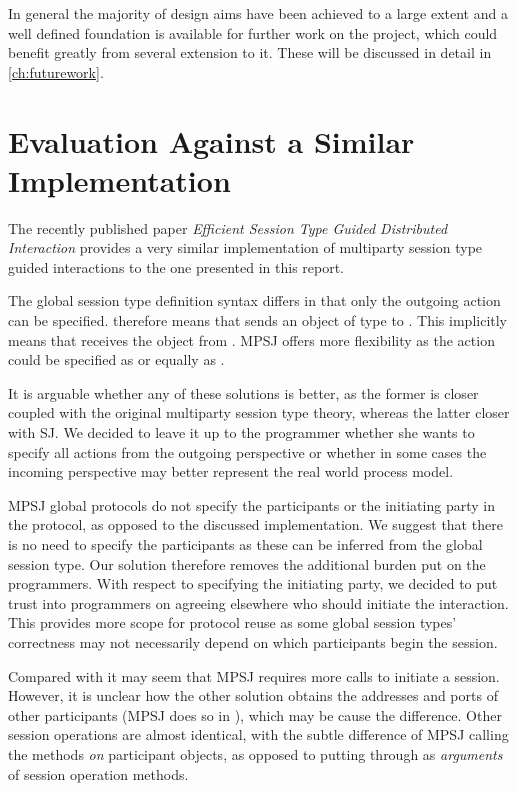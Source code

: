 In general the majority of design aims have been achieved to a large extent and a well defined foundation is available for further work on the project, which could benefit greatly from several extension to it. These will be discussed in detail in \autoref{ch:futurework}.


\section{Evaluation Against a Similar Implementation}

The recently published paper \textit{Efficient Session Type Guided Distributed Interaction} provides a very similar implementation of multiparty session type guided interactions to the one presented in this report. 

The global session type definition syntax differs in that only the outgoing action can be specified.  therefore means that  sends an object of type  to . This implicitly means that  receives the object from . MPSJ offers more flexibility as the action could be specified as  or equally as . 

It is arguable whether any of these solutions is better, as the former is closer coupled with the original multiparty session type theory, whereas the latter closer with SJ. We decided to leave it up to the programmer whether she wants to specify all actions from the outgoing perspective or whether in some cases the incoming perspective may better represent the real world process model.

MPSJ global protocols do not specify the participants or the initiating party in the protocol, as opposed to the discussed implementation. We suggest that there is no need to specify the participants as these can be inferred from the global session type. Our solution therefore removes the additional burden put on the programmers. With respect to specifying the initiating party, we decided to put trust into programmers on agreeing elsewhere who should initiate the interaction. This provides more scope for protocol reuse as some global session types' correctness may not necessarily depend on which participants begin the session.

Compared with \cite{sess_type_guided_distr_interact} it may seem that MPSJ requires more calls to initiate a session. However, it is unclear how the other solution obtains the addresses and ports of other participants (MPSJ does so in ), which may be cause the difference. Other session operations are almost identical, with the subtle difference of MPSJ calling the methods \textit{on} participant objects, as opposed to putting through as \textit{arguments} of session operation methods.

